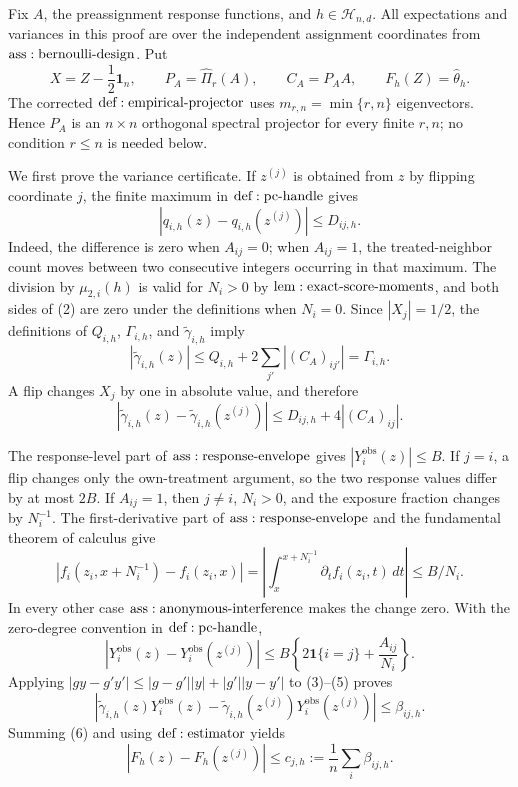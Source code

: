 Fix \(A\), the preassignment response functions, and \(h\in\mathcal H_{n,d}\).  All expectations and variances in this proof are over the independent assignment coordinates from \({\rm ass:bernoulli\text{-}design}\).  Put
\[
 X=Z-\frac12\mathbf1_n,\qquad
 P_A=\widehat\Pi_r(A),\qquad
 C_A=P_AA,\qquad
 F_h(Z)=\widehat\theta_h.
\tag{1}
\]
The corrected \({\rm def:empirical\text{-}projector}\) uses \(m_{r,n}=\min\{r,n\}\) eigenvectors.  Hence \(P_A\) is an \(n\times n\) orthogonal spectral projector for every finite \(r,n\); no condition \(r\leq n\) is needed below.

We first prove the variance certificate.  If \(z^{(j)}\) is obtained from \(z\) by flipping coordinate \(j\), the finite maximum in \({\rm def:pc\text{-}handle}\) gives
\[
 |q_{i,h}(z)-q_{i,h}(z^{(j)})|\leq D_{ij,h}.
\tag{2}
\]
Indeed, the difference is zero when \(A_{ij}=0\); when \(A_{ij}=1\), the treated-neighbor count moves between two consecutive integers occurring in that maximum.  The division by \(\mu_{2,i}(h)\) is valid for \(N_i>0\) by \({\rm lem:exact\text{-}score\text{-}moments}\), and both sides of (2) are zero under the definitions when \(N_i=0\).  Since \(|X_j|=1/2\), the definitions of \(Q_{i,h}\), \(\Gamma_{i,h}\), and \(\widetilde\gamma_{i,h}\) imply
\[
 |\widetilde\gamma_{i,h}(z)|
 \leq Q_{i,h}+2\sum_{j'}|(C_A)_{ij'}|
 =\Gamma_{i,h}.
\tag{3}
\]
A flip changes \(X_j\) by one in absolute value, and therefore
\[
 |\widetilde\gamma_{i,h}(z)-\widetilde\gamma_{i,h}(z^{(j)})|
 \leq D_{ij,h}+4|(C_A)_{ij}|.
\tag{4}
\]

The response-level part of \({\rm ass:response\text{-}envelope}\) gives \(|Y_i^{\mathrm{obs}}(z)|\leq B\).  If \(j=i\), a flip changes only the own-treatment argument, so the two response values differ by at most \(2B\).  If \(A_{ij}=1\), then \(j\ne i\), \(N_i>0\), and the exposure fraction changes by \(N_i^{-1}\).  The first-derivative part of \({\rm ass:response\text{-}envelope}\) and the fundamental theorem of calculus give
\[
 |f_i(z_i,x+N_i^{-1})-f_i(z_i,x)|
 =\left|\int_x^{x+N_i^{-1}}\partial_t f_i(z_i,t)\,dt\right|
 \leq B/N_i.
\]
In every other case \({\rm ass:anonymous\text{-}interference}\) makes the change zero.  With the zero-degree convention in \({\rm def:pc\text{-}handle}\),
\[
 |Y_i^{\mathrm{obs}}(z)-Y_i^{\mathrm{obs}}(z^{(j)})|
 \leq B\left\{2\mathbf1\{i=j\}+\frac{A_{ij}}{N_i}\right\}.
\tag{5}
\]
Applying \(|gy-g'y'|\leq|g-g'||y|+|g'||y-y'|\) to (3)--(5) proves
\[
 |\widetilde\gamma_{i,h}(z)Y_i^{\mathrm{obs}}(z)
 -\widetilde\gamma_{i,h}(z^{(j)})Y_i^{\mathrm{obs}}(z^{(j)})|
 \leq\beta_{ij,h}.
\tag{6}
\]
Summing (6) and using \({\rm def:estimator}\) yields
\[
 |F_h(z)-F_h(z^{(j)})|
 \leq c_{j,h}:=\frac1n\sum_i\beta_{ij,h}.
\tag{7}
\]

